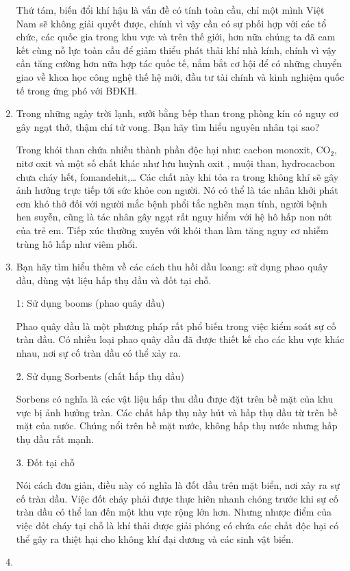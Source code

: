 \begin{enumerate}[label=\bfseries Câu \arabic*:]
{		Thứ tám, biến đổi khí hậu là vấn đề có tính toàn cầu, chỉ một mình Việt Nam sẽ không giải quyết được, chính vì vậy cần có sự phối hợp với các tổ chức, các quốc gia trong khu vực và trên thế giới, hơn nữa chúng ta đã cam kết cùng nỗ lực toàn cầu để giảm thiểu phát thải khí nhà kính, chính vì vậy cần tăng cường hơn nữa hợp tác quốc tế, nắm bắt cơ hội để có những chuyển giao về khoa học công nghệ thế hệ mới, đầu tư tài chính và kinh nghiệm quốc tế trong ứng phó với BĐKH.
	}
	\item {}
	
	
	{
		Trong những ngày trời lạnh, sưởi bằng bếp than trong phòng kín có nguy cơ gây ngạt thở, thậm chí tử vong. Bạn hãy tìm hiểu nguyên nhân tại sao?
	}
	
	\hideall
	{
		Trong khói than chứa nhiều thành phần độc hại như: cacbon monoxit, CO$_2$, nitơ oxit và một số chất khác như lưu huỳnh oxit , muội than, hydrocacbon chưa cháy hết, fomandehit,… Các chất này khi tỏa ra trong không khí sẽ gây ảnh hưởng trực tiếp tới sức khỏe con người. Nó có thể là tác nhân khởi phát cơn khó thở đối với người mắc bệnh phổi tắc nghẽn mạn tính, người bệnh hen suyễn, cũng là tác nhân gây ngạt rất nguy hiểm với hệ hô hấp non nớt của trẻ em. Tiếp xúc thường xuyên với khói than làm tăng nguy cơ nhiễm trùng hô hấp như viêm phổi.
	}
	\item {}
	
	
	{
		Bạn hãy tìm hiểu thêm về các cách thu hồi dầu loang: sử dụng phao quây dầu, dùng vật liệu hấp thụ dầu và đốt tại chỗ. 
	}
	
	\hideall
	{
		1: Sử dụng booms (phao quây dầu)
		
		Phao quây dầu là một phương pháp rất phổ biến trong việc kiểm soát sự cố tràn dầu. Có nhiều loại phao quây dầu đã được thiết kế cho các khu vực khác nhau, nơi sự cố tràn dầu có thể xảy ra.
		
		2. Sử dụng Sorbents (chất hấp thụ dầu)
		
		Sorbens có nghĩa là các vật liệu hấp thu dầu được đặt trên bề mặt của khu vực bị ảnh hưởng tràn. Các chất hấp thụ này hút và hấp thụ dầu từ trên bề mặt của nước. Chúng nổi trên bề mặt nước, không hấp thụ nước nhưng hấp thụ dầu rất mạnh.
		
		3. Đốt tại chỗ
		
		Nói cách đơn giản, điều này có nghĩa là đốt dầu trên mặt biển, nơi xảy ra sự cố tràn dầu. Việc đốt cháy phải được thực hiên nhanh chóng trước khi sự cố tràn dầu có thể lan đến một khu vực rộng lớn hơn. Nhưng nhược điểm của việc đốt cháy tại chỗ là khí thải được giải phóng có chứa các chất độc hại có thể gây ra thiệt hại cho không khí đại dương và các sinh vật biển.
	}
	\item {}
	

\end{enumerate}
